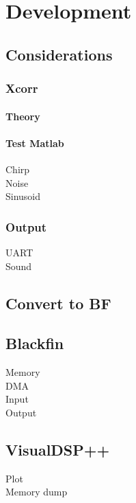 \chapter{Development}
\section{Considerations}
\subsection{Xcorr}
\subsubsection{Theory}
\subsubsection{Test Matlab}
Chirp\\
Noise\\
Sinusoid\\
\subsection{Output}
UART\\
Sound\\
\section{Convert to BF}
\section{Blackfin}
Memory\\
DMA\\
Input\\
Output\\
\section{VisualDSP++}
Plot\\
Memory dump\\
